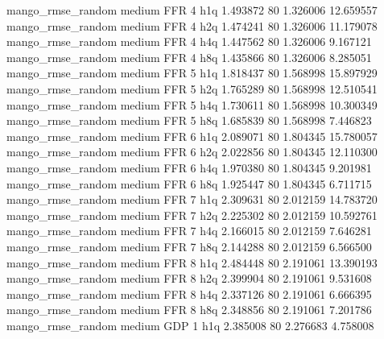 mango_rmse_random     medium      FFR                 4                  h1q  1.493872 80       1.326006          12.659557
mango_rmse_random     medium      FFR                 4                  h2q  1.474241 80       1.326006          11.179078
mango_rmse_random     medium      FFR                 4                  h4q  1.447562 80       1.326006           9.167121
mango_rmse_random     medium      FFR                 4                  h8q  1.435866 80       1.326006           8.285051
mango_rmse_random     medium      FFR                 5                  h1q  1.818437 80       1.568998          15.897929
mango_rmse_random     medium      FFR                 5                  h2q  1.765289 80       1.568998          12.510541
mango_rmse_random     medium      FFR                 5                  h4q  1.730611 80       1.568998          10.300349
mango_rmse_random     medium      FFR                 5                  h8q  1.685839 80       1.568998           7.446823
mango_rmse_random     medium      FFR                 6                  h1q  2.089071 80       1.804345          15.780057
mango_rmse_random     medium      FFR                 6                  h2q  2.022856 80       1.804345          12.110300
mango_rmse_random     medium      FFR                 6                  h4q  1.970380 80       1.804345           9.201981
mango_rmse_random     medium      FFR                 6                  h8q  1.925447 80       1.804345           6.711715
mango_rmse_random     medium      FFR                 7                  h1q  2.309631 80       2.012159          14.783720
mango_rmse_random     medium      FFR                 7                  h2q  2.225302 80       2.012159          10.592761
mango_rmse_random     medium      FFR                 7                  h4q  2.166015 80       2.012159           7.646281
mango_rmse_random     medium      FFR                 7                  h8q  2.144288 80       2.012159           6.566500
mango_rmse_random     medium      FFR                 8                  h1q  2.484448 80       2.191061          13.390193
mango_rmse_random     medium      FFR                 8                  h2q  2.399904 80       2.191061           9.531608
mango_rmse_random     medium      FFR                 8                  h4q  2.337126 80       2.191061           6.666395
mango_rmse_random     medium      FFR                 8                  h8q  2.348856 80       2.191061           7.201786
mango_rmse_random     medium      GDP                 1                  h1q  2.385008 80       2.276683           4.758008
